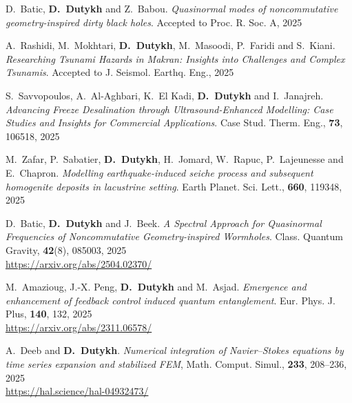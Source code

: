 \documentclass[final, a4paper, oneside, 12pt]{article}
\numberwithin{equation}{section}
\begin{document}
\begin{etaremune}

  

  \item D.~Batic, \textbf{D.~Dutykh} and Z.~Babou. \textit{Quasinormal modes of noncommutative geometry-inspired dirty black holes}. Accepted to Proc. R. Soc. A, 2025 %
  
  \item A.~Rashidi, M.~Mokhtari, \textbf{D.~Dutykh}, M.~Masoodi, P.~Faridi and S.~Kiani. \textit{Researching Tsunami Hazards in Makran: Insights into Challenges and Complex Tsunamis}. Accepted to J. Seismol. Earthq. Eng., 2025 %

  \item S.~Savvopoulos, A.~Al-Aghbari, K.~El Kadi, \textbf{D.~Dutykh} and I.~Janajreh. \textit{Advancing Freeze Desalination through Ultrasound-Enhanced Modelling: Case Studies and Insights for Commercial Applications}. Case Stud. Therm. Eng., \textbf{73}, 106518, 2025 %

  \item M.~Zafar, P.~Sabatier, \textbf{D.~Dutykh}, H.~Jomard, W.~Rapuc, P.~Lajeunesse and E.~Chapron. \textit{Modelling earthquake-induced seiche process and subsequent homogenite deposits in lacustrine setting}. Earth Planet. Sci. Lett., \textbf{660}, 119348, 2025 %

  \item D.~Batic, \textbf{D.~Dutykh} and J.~Beek. \textit{A Spectral Approach for Quasinormal Frequencies of Noncommutative Geometry-inspired Wormholes}. Class. Quantum Gravity, \textbf{42}(8), 085003, 2025 \\ %
  \url{https://arxiv.org/abs/2504.02370/}

  \item M.~Amazioug, J.-X. Peng, \textbf{D.~Dutykh} and M.~Asjad. \textit{Emergence and enhancement of feedback control induced quantum entanglement}. Eur. Phys. J. Plus, \textbf{140}, 132, 2025 \\ %
  \url{https://arxiv.org/abs/2311.06578/}

  \item A.~Deeb and \textbf{D.~Dutykh}. \textit{Numerical integration of Navier--Stokes equations by time series expansion and stabilized FEM}, Math. Comput. Simul., \textbf{233}, 208--236, 2025 \\ %
  \url{https://hal.science/hal-04932473/}


\end{etaremune}
\end{document}
